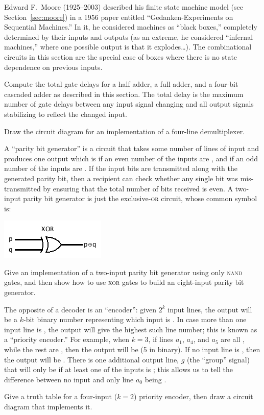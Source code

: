 \begin{tailquote}
Edward F.~Moore (1925--2003) described his finite state machine model (see Section~\ref{sec:moore}) in a 1956 paper entitled ``Gedanken-Experiments on Sequential Machines.'' In it, he considered machines as ``black boxes,'' completely determined by their inputs and outputs (as an extreme, he considered ``infernal machines,'' where one possible output is that it explodes\ldots). The combinational circuits in this section are the special case of boxes where there is no state dependence on previous inputs.
\end{tailquote}
\begin{exercises}
\problem\label{ex:cascade} Compute the total gate delays for a half adder, a full adder, and a four-bit cascaded adder as described in this section. The total delay is the maximum number of gate delays between any input signal changing and all output signals stabilizing to reflect the changed input.

\problem Draw the circuit diagram for an implementation of a four-line demultiplexer.

\problem A ``parity bit generator'' is a circuit that takes some number of lines of input and produces one output which is \0 if an even number of the inputs are \1, and \1 if an odd number of the inputs are \1. If the input bits are transmitted along with the generated parity bit, then a recipient can check whether any single bit was mis-transmitted by ensuring that the total number of \1 bits received is even. A two-input parity bit generator is just the exclusive-\textsc{or} circuit, whose common symbol is:
\begin{center}
\includegraphics[width=!,height=!,scale=0.75]{graphics/XOR.png}
\end{center}
Give an implementation of a two-input parity bit generator using only \textsc{nand} gates, and then show how to use \textsc{xor} gates to build an eight-input parity bit generator.

\problem The opposite of a decoder is an ``encoder'': given $2^k$ input lines, the output will be a $k$-bit binary number representing which input is \1. In case more than one input line is \1, the output will give the highest such line number; this is known as a ``priority encoder.'' For example, when $k=3$, if lines $a_1$, $a_4$, and $a_5$ are all \1, while the rest are \0, then the output will be \1\0\1 (5 in binary). If no input line is \1, then the output will be \0\0\0. There is one additional output line, $g$ (the ``group'' signal) that will only be \1 if at least one of the inputs is \1; this allows us to tell the difference between no input and only line $a_0$ being \1.

Give a truth table for a four-input ($k=2$) priority encoder, then draw a circuit diagram that implements it.
\end{exercises}

